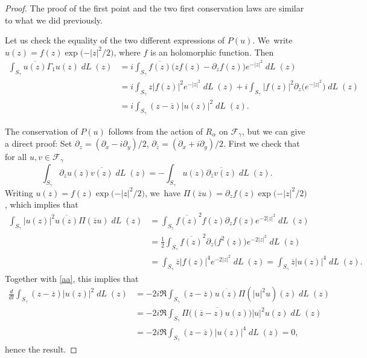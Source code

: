\documentclass[JEP,XML,SOM,Unicode,NoFloatCountersInSection,published]{cedram}
\DeclareMathOperator{\dL}{\mathit{dL}}
\theoremstyle{definition}
\let\EE\exp
\let\ov\overline
\begin{document}
\begin{proof}
The proof of the first point and the two first conservation laws are similar to what we did previously.

Let us check the equality of the two different expressions of $P(u)$. We~write $u(z)=f(z)\EE\bigl({-{|z|^2}/2}\bigr)$, where $f$ is an holomorphic function. Then
\begin{align*}
\int_{S_{\gamma}}\ov{u(z)} \Gamma_1 u(z)\dL(z)&= i \int_{S_{\gamma}}\ov{f(z)}\bigl(z f(z) -\partial_z f(z)\bigr) e^{-|z|^2} \dL(z) \\
&= i \int_{S_{\gamma}} z |f(z)|^2 e^{-|z|^2} \dL(z)+ i \int_{S_{\gamma}} |f(z)|^2 \partial_z \bigl(e^{-|z|^2} \bigr) \dL(z) \\
&= i \int_{S_{\gamma}}(z-\ov{z})|u(z)|^{2}\dL(z).
\end{align*}

The conservation of $P(u)$ follows from the action of $R_{\alpha}$ on $\mathcal{F}_{\gamma}$, but we can give a direct proof: Set $\partial_{z}=(\partial_{x}-i\partial_{y})/2$, $\partial_{\overline{z}}=(\partial_{x}+i\partial_{y})/2$. First we check that for all $u,v\in \mathcal{F}_{\gamma}$
\begin{equation*}
\int_{S_{\gamma}} \partial_z u(z) \ov{v(z)}\dL(z)= -\int_{S_{\gamma}} u(z) \ov{\partial_{\ov{z}}v(z)}\dL(z).
\end{equation*}
Writing $u(z)=f(z)\EE\bigl({-\vert z\vert^2/2}\bigr)$, we~have $\Pi(\ov{z}u)=\partial_z f(z)\EE\bigl({-\vert z\vert^2/2}\bigr)$, which implies that
\begin{align*}
\int_{S_{\gamma}} \vert {u(z)} \vert^2\ov{u(z)}\Pi(\ov{z}u)\dL(z) &= \int_{S_{\gamma}} \ov{f(z)}^2f(z) \partial_z f(z) e^{-2\vert z\vert^2}\dL(z) \\
&=\frac12 \int_{S_{\gamma}} \ov{f(z)}^2 \partial_z\bigl(f^2(z)\bigr) e^{-2\vert z\vert^2}\dL(z)\\
&= \int_{S_{\gamma}}\ov{z}\vert f(z)\vert^4 e^{-2\vert z\vert^2}\dL(z) 
= \int_{S_{\gamma}}\ov{z}\vert u(z)\vert^4 \dL(z).
\end{align*}
Together with \eqref{aa}, this implies that
\begin{align*}
\frac{d}{dt}\int_{S_{\gamma}}(z-\ov{z})|u(z)|^{2}\dL(z) &= -2i \Re \int_{S_{\gamma}}(z-\ov{z})\ov{u(z)} \Pi(|u|^{2}u)(z)\dL(z) \\
& = -2i \Re \int_{S_{\gamma}}\ov{\Pi\bigl((\ov{z}-z)u(z)\bigr)}|u|^{2}u(z)\dL(z) \\
& = -2i \Re \int_{S_{\gamma}}(z-\ov{z})|u(z)|^{4}\dL(z)=0,
\end{align*}
hence the result.
\end{proof}
\end{document}
